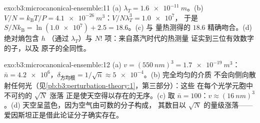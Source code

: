\begin{solution}{exo:b3:microcanonical-ensemble:11}
(a) $\lambda_T = \qty{1.6e-11}{m}$。(b) $V/N = k_{\text{B}}T/P =
\qty{4.1e-26}{m^3}$：$V/N\lambda_T^3 = \num{1.0e7}$，
于是 $S/Nk_{\text{B}} = \ln(\num{1.0e7}) + 2.5 = 18.6$。(c) 与
量热测得的 $18.6$ 精确吻合。(d) 绝对熵包含 $h$
（通过 $\lambda_T$）与 $N!$ 项：来自蒸汽时代的热测量
证实到三位有效数字的子，以及
原子的全同性。
\end{solution}

\begin{solution}{exo:b3:microcanonical-ensemble:12}
(a) $v = (\qty{550}{nm})^3 = \qty{1.7e-19}{m^3}$：$\bar n =
\num{4.2e6}$，$\delta_{\text{方均根}} = 1/\sqrt{\bar n} \approx
\num{5e-4}$。(b) 完全均匀的介质
不会向侧向散射任何光（见\cref{pb:b3:perturbation-theory:1}，第三部分）：这些
在每个光学元胞中不可约的 $\sqrt N$ 涨落
正是使天空得以存在的无序。(c) 取 $\bar n = 100$：$v
\approx (\qty{16}{nm})^3$。(d) 天空呈蓝色，因为空气由可数的分子构成，
其数目以 $\sqrt N$ 的量级涨落——
爱因斯坦正是借此论证分子确实存在。
\end{solution}

